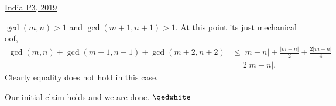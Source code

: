 \begin{problem}{2}{\href{https://artofproblemsolving.com/community/c6h1770752p34739465}{India P3, 2019}}
\begin{solution}
\begin{mycases}
		\item $\gcd(m, n)>1$ and $\gcd(m+1, n+1)>1$. At this point its just mechanical oof,
		\begin{align*}
			\gcd(m,n) + \gcd(m+1,n+1) + \gcd(m+2,n+2) &\le |m-n|+\frac{|m-n|}{2}+\frac{2|m-n|}{4}\\
			&= 2|m-n|.
		\end{align*}
		Clearly equality does not hold in this case.
	\end{mycases}
	
	\noindent Our initial claim holds and we are done. $\qedwhite$
	\end{solution}
\end{problem}
